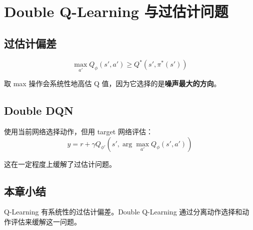 \section{Double Q-Learning 与过估计问题}

\subsection{过估计偏差}

$$\max_{a'} Q_\phi(s', a') \geq Q^*(s', \pi^*(s'))$$

取 max 操作会系统性地高估 Q 值，因为它选择的是\textbf{噪声最大的方向}。

\subsection{Double DQN}

使用当前网络选择动作，但用 target 网络评估：
$$y = r + \gamma Q_{\phi'}\left(s', \arg\max_{a'} Q_\phi(s', a')\right)$$

这在一定程度上缓解了过估计问题。

\subsection{本章小结}

Q-Learning 有系统性的过估计偏差。Double Q-Learning 通过分离动作选择和动作评估来缓解这一问题。

